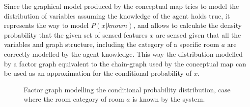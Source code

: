 Since the graphical model produced by the conceptual map tries to model the distribution of
variables assuming the knowledge of the agent holds true, it represents the way to model
$P(x|known)$, and allows to calculate the density probability that the given set of sensed
features $x$ are sensed given that all the variables and graph structure, including the category of
a specific room $a$ are correctly modelled by the agent knowledge.
This way the distribution modelled by a factor graph equivalent to the chain-graph used by
the conceptual map can be used as an approximation for the conditional probability of $x$.

\begin{figure}[h]
\centering
{}

\caption{Factor graph modelling the conditional probability distribution, case where the
         room category of room $a$ is known by the system.}
\end{figure}


